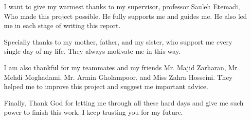 
I want to give my warmest thanks to my supervisor, professor Sauleh Etemadi, Who made this project possible. He fully supports me and guides me. He also led me in each stage of writing this report.  

Specially thanks to my mother, father, and my sister, who support me every single day of my life. They always motivate me in this way.

I am also thankful for my teammates and my friends Mr. Majid Zarharan, Mr. Mehdi Moghadami, Mr. Armin Gholampoor, and Miss Zahra Hosseini. They helped me to improve this project and suggest me important advice. 

Finally, Thank God for letting me through all these hard days and give me such power to finish this work. I keep trusting you for my future.  	